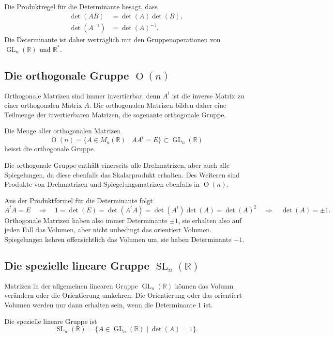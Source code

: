 Die Produktregel für die Determinante besagt, dass 
\begin{align*}
\det(AB)&=\det(A)\det(B),
\\
\det(A^{-1})&=\det(A)^{-1}.
\end{align*}
Die Determinante ist daher verträglich mit den Gruppenoperationen
von $\operatorname{GL}_n(\mathbb R)$ und $\mathbb R^*$.

%
%
\subsection{Die orthogonale Gruppe $\operatorname{O}(n)$
\label{subsection:orthogonale gruppe}}
Orthogonale Matrizen sind immer invertierbar, denn $A^t$ ist die 
inverse Matrix zu einer orthogonalen Matrix $A$.
Die orthogonalen Matrizen bilden daher eine Teilmenge der invertierbaren
Matrizen, die sogenante orthogonale Gruppe.

\begin{definition}
Die Menge aller orthogonalen Matrizen
\[
\operatorname{O}(n) = \{ A\in M_n(\mathbb R)\;|\; AA^t = E \}
\subset \operatorname{GL}_n(\mathbb R)
\]
heisst die orthogonale Gruppe.
\end{definition}
Die orthogonale Gruppe enthält einerseits alle Drehmatrizen, aber auch
alle Spiegelungen, da diese ebenfalls das Skalarprodukt erhalten.
Des Weiteren sind Produkte von Drehmatrizen und Spiegelungsmatrizen
ebenfalls in $\operatorname{O}(n)$.

Aus der Produktformel für die Determinante folgt
\[
A^tA=E
\quad\Rightarrow\quad
1
=
\det(E)
=
\det(A^tA)
=
\det(A^t)\det(A)
=
\det(A)^2
\quad\Rightarrow\quad
\det(A)=\pm 1.
\]
Orthogonale Matrizen haben also immer Determinante $\pm 1$, sie erhalten
also auf jeden Fall das Volumen, aber nicht unbedingt das orientiert
Volumen.
Spiegelungen kehren offensichtlich das Volumen um, sie haben Determinante
$-1$.

%
%
\subsection{Die spezielle lineare Gruppe $\operatorname{SL}_n(\mathbb R)$}
Matrizen in der allgemeinen linearen Gruppe $\operatorname{GL}_n(\mathbb R)$
können das Volumn verändern oder die Orientierung umkehren.
Die Orientierung oder das orientiert Volumen werden nur dann erhalten
sein, wenn die Determinante $1$ ist.

\begin{definition}
Die spezielle lineare Gruppe ist
\[
\operatorname{SL}_n(\mathbb R)
=
\{ A\in\operatorname{GL}_n(\mathbb R) \;|\; \det (A)=1\}.
\]
\end{definition}

